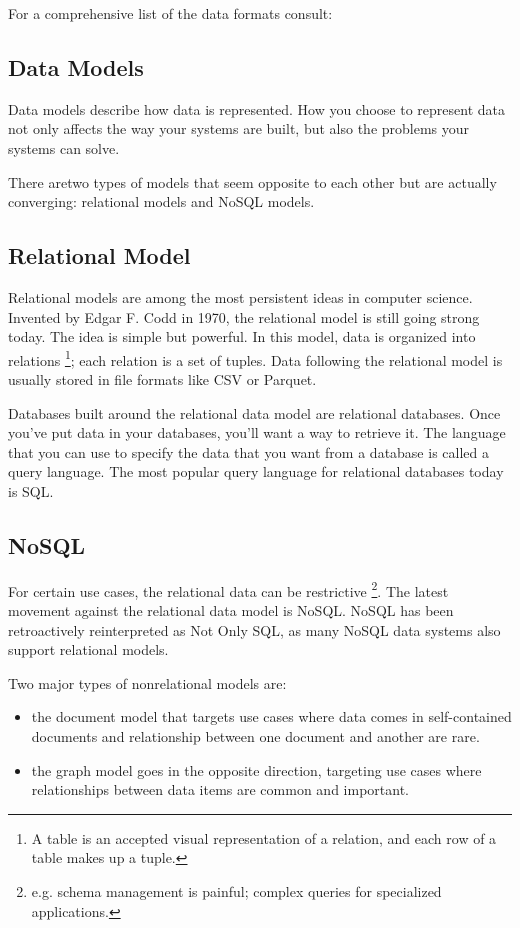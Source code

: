 For a comprehensive list of the data formats consult:



\subsection{Data Models}
Data models describe how data is represented. How you choose to
represent data not only affects the way your systems are built,
but also the problems your systems can solve.

There aretwo types of models that seem opposite to each other
but are actually converging: relational models and NoSQL models.


\subsection*{Relational Model}
Relational models are among the most persistent ideas in computer
science. Invented by Edgar F. Codd in 1970, the relational model
is still going strong today. The idea is simple but powerful.
In this model, data is organized into relations
\footnote{
    A table is an accepted visual representation of a relation, 
    and each row of a table makes up a tuple.

};
each relation is a set of tuples. Data following the relational
model is usually stored in file formats like CSV or Parquet.

Databases built around the relational data model are relational
databases. Once you've put data in your databases, you'll want
a way to retrieve it. The language that you can use to specify
the data that you want from a database is called a query
language. The most popular query language for relational
databases today is SQL.



\subsection*{NoSQL}
For certain use cases, the relational data can be restrictive
\footnote{
    e.g. schema management is painful; complex queries for
    specialized applications.
}.
The latest movement against the relational data model is NoSQL.
NoSQL has been retroactively reinterpreted as Not Only SQL,
as many NoSQL data systems also support relational models.

Two major types of nonrelational models are:
\begin{itemize}
    \item the document model that targets use cases where
    data comes in self-contained documents and relationship
    between one document and another are rare.

    \item the graph model goes in the opposite direction,
    targeting use cases where relationships between data
    items are common and important.
\end{itemize}




